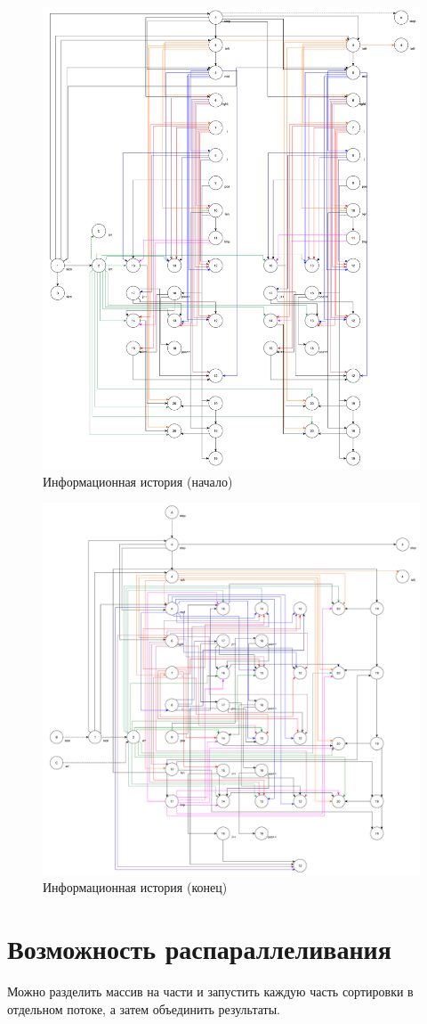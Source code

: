 \begin{figure}[h]
	\centering
	\includegraphics[height=0.7\textheight]{img/информационная_история_1.pdf}
	\caption{Информационная история (начало)}
	\label{fg:ii_1}
\end{figure}

\clearpage

\begin{figure}[h]
	\centering
	\includegraphics[height=0.6\textheight]{img/информационная_история_2.pdf}
	\caption{Информационная история (конец)}
	\label{fg:ii_2}
\end{figure}

\clearpage

\section*{Возможность распараллеливания}
Можно разделить массив на части и запустить каждую часть сортировки в отдельном потоке, а затем объединить результаты.